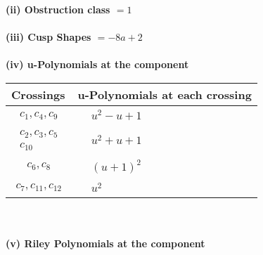 \documentclass[1p]{elsarticle_modified}
\theoremstyle{definition}
\begin{document}
\flushleft \textbf{(ii) Obstruction class $= 1$}\\~\\
\flushleft \textbf{(iii) Cusp Shapes $= -8 a+2$}\\~\\
\newpage\renewcommand{\arraystretch}{1}
\flushleft \textbf{(iv) u-Polynomials at the component}\newline \\
\begin{tabular}{m{50pt}|m{274pt}}
Crossings & \hspace{64pt}u-Polynomials at each crossing \\
\hline $$\begin{aligned}c_{1},c_{4},c_{9}\end{aligned}$$&$\begin{aligned}
&u^2- u+1
\end{aligned}$\\
\hline $$\begin{aligned}c_{2},c_{3},c_{5}\\c_{10}\end{aligned}$$&$\begin{aligned}
&u^2+u+1
\end{aligned}$\\
\hline $$\begin{aligned}c_{6},c_{8}\end{aligned}$$&$\begin{aligned}
&(u+1)^2
\end{aligned}$\\
\hline $$\begin{aligned}c_{7},c_{11},c_{12}\end{aligned}$$&$\begin{aligned}
&u^2
\end{aligned}$\\
\hline
\end{tabular}\\~\\
\newpage\renewcommand{\arraystretch}{1}
\flushleft \textbf{(v) Riley Polynomials at the component}\newline \\
\end{document}
